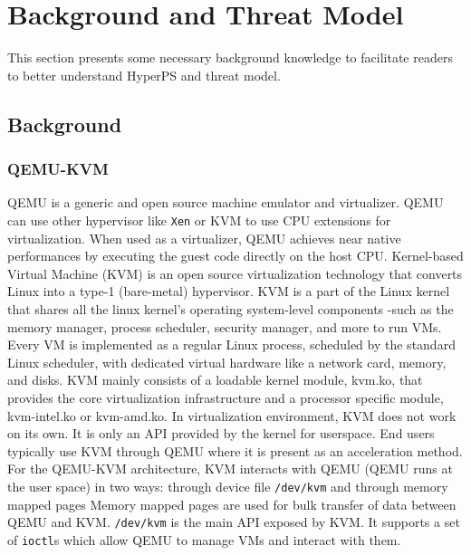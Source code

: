\section{Background and Threat Model}%
\label{sec:background_and_threat_model}

This section presents some necessary background knowledge to facilitate readers to better understand HyperPS and threat model. 


\subsection{Background}%
\label{sub:background}

\subsubsection{QEMU-KVM}%
\label{ssub:qemu_kvm}
QEMU is a generic and open source machine emulator and virtualizer. QEMU can use other hypervisor like \verb|Xen| or KVM to use CPU extensions for virtualization. When used as a virtualizer, QEMU achieves near native performances by executing the guest code directly on the host CPU.
Kernel-based Virtual Machine (KVM) is an open source virtualization technology that converts Linux into a type-1 (bare-metal) hypervisor. KVM is a part of the Linux kernel that shares all the linux kernel's operating system-level components -such as the memory manager, process scheduler, security manager, and more to run VMs. Every VM is implemented as a regular Linux process, scheduled by the standard Linux scheduler, with dedicated virtual hardware like a network card, memory, and disks. KVM mainly consists of a loadable kernel module, kvm.ko, that provides the core virtualization infrastructure and a processor specific module, kvm-intel.ko or kvm-amd.ko.
In virtualization environment, KVM does not work on its own. It is only an API provided by the kernel for userspace. End users typically use KVM through QEMU where it is present as an acceleration method.
For the QEMU-KVM architecture, KVM interacts with QEMU (QEMU runs at the user space) in two ways: through device file \verb|/dev/kvm| and through memory mapped pages
Memory mapped pages are used for bulk transfer of data between QEMU and KVM. \verb|/dev/kvm| is the main API exposed by KVM. It supports a set of \verb|ioctl|s which allow QEMU to manage VMs and interact with them.



